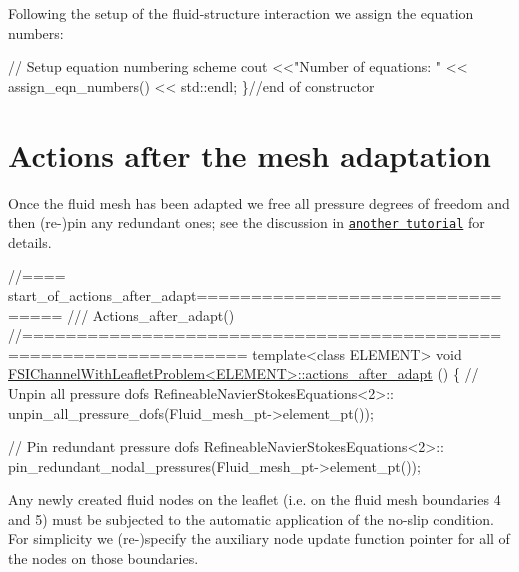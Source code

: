 Following the setup of the fluid-\/structure interaction we assign the equation numbers\+:


\begin{DoxyCodeInclude}
 \textcolor{comment}{// Setup equation numbering scheme}
 cout <<\textcolor{stringliteral}{"Number of equations: "} << assign\_eqn\_numbers() << std::endl; 
\}\textcolor{comment}{//end of constructor}

\end{DoxyCodeInclude}




 

\hypertarget{index_adapt}{}\section{Actions after the mesh adaptation}\label{index_adapt}
Once the fluid mesh has been adapted we free all pressure degrees of freedom and then (re-\/)pin any redundant ones; see the discussion in \href{../../../navier_stokes/adaptive_driven_cavity/html/index.html}{\tt another tutorial} for details.


\begin{DoxyCodeInclude}
\textcolor{comment}{//==== start\_of\_actions\_after\_adapt=================================}
\textcolor{comment}{/// Actions\_after\_adapt()}
\textcolor{comment}{}\textcolor{comment}{//==================================================================}
\textcolor{keyword}{template}<\textcolor{keyword}{class} ELEMENT>
\textcolor{keywordtype}{void} \hyperlink{classFSIChannelWithLeafletProblem_acc3f4745ea9b4524aebbc4f2556d1286}{FSIChannelWithLeafletProblem<ELEMENT>::actions\_after\_adapt}
      ()
\{
 \textcolor{comment}{// Unpin all pressure dofs}
 RefineableNavierStokesEquations<2>::
  unpin\_all\_pressure\_dofs(Fluid\_mesh\_pt->element\_pt());
 
 \textcolor{comment}{// Pin redundant pressure dofs}
 RefineableNavierStokesEquations<2>::
  pin\_redundant\_nodal\_pressures(Fluid\_mesh\_pt->element\_pt());

\end{DoxyCodeInclude}


Any newly created fluid nodes on the leaflet (i.\+e. on the fluid mesh boundaries 4 and 5) must be subjected to the automatic application of the no-\/slip condition. For simplicity we (re-\/)specify the auxiliary node update function pointer for all of the nodes on those boundaries.


